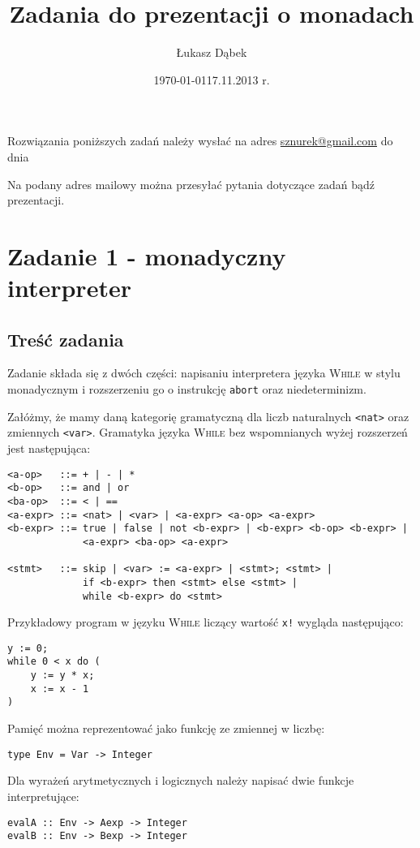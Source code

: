 \documentclass{article}[12pt]
\title{Zadania do prezentacji o monadach}
\author{Łukasz Dąbek}
\date{\today}
\begin{document}
\maketitle

Rozwiązania poniższych zadań należy wysłać na adres \href{mailto:sznurek@gmail.com}{sznurek@gmail.com}
do dnia \date{17.11.2013 r.} Na podany adres mailowy można przesyłać
pytania dotyczące zadań bądź prezentacji.

\section{Zadanie 1 - monadyczny interpreter}
\subsection{Treść zadania}
Zadanie składa się z dwóch części: napisaniu interpretera języka
\textsc{While} w stylu monadycznym\cite{essence} i rozszerzeniu go o instrukcję
\texttt{abort} oraz niedeterminizm.

Załóżmy, że mamy daną kategorię gramatyczną dla liczb naturalnych \texttt{<nat>}
oraz zmiennych \texttt{<var>}. Gramatyka języka \textsc{While} bez wspomnianych
wyżej rozszerzeń jest następująca:
\begin{verbatim}
<a-op>   ::= + | - | *
<b-op>   ::= and | or
<ba-op>  ::= < | ==
<a-expr> ::= <nat> | <var> | <a-expr> <a-op> <a-expr>
<b-expr> ::= true | false | not <b-expr> | <b-expr> <b-op> <b-expr> |
             <a-expr> <ba-op> <a-expr>

<stmt>   ::= skip | <var> := <a-expr> | <stmt>; <stmt> |
             if <b-expr> then <stmt> else <stmt> |
             while <b-expr> do <stmt>
\end{verbatim}
Przykładowy program w języku \textsc{While} liczący wartość \texttt{x!} wygląda
następująco:
\begin{verbatim}
y := 0;
while 0 < x do (
    y := y * x;
    x := x - 1
)
\end{verbatim}

Pamięć można reprezentować jako funkcję ze zmiennej w liczbę:
\begin{verbatim}
type Env = Var -> Integer
\end{verbatim}

Dla wyrażeń arytmetycznych i logicznych należy napisać dwie
funkcje interpretujące:
\begin{verbatim}
evalA :: Env -> Aexp -> Integer
evalB :: Env -> Bexp -> Integer
\end{verbatim}
\end{document}
